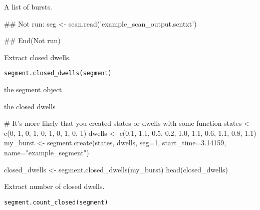 \documentclass[letterpaper]{book}
\begin{document}
%
\begin{Value}
A list of bursts.
\end{Value}
%
\begin{Examples}
\begin{ExampleCode}
## Not run: 
seg <- scan.read('example_scan_output.scntxt')

## End(Not run)
\end{ExampleCode}
\end{Examples}
%
\begin{Description}\relax
Extract closed dwells.
\end{Description}
%
\begin{Usage}
\begin{verbatim}
segment.closed_dwells(segment)
\end{verbatim}
\end{Usage}
%
\begin{Arguments}
\begin{ldescription}
\item[\code{segment}] the segment object
\end{ldescription}
\end{Arguments}
%
\begin{Value}
the closed dwells
\end{Value}
%
\begin{Examples}
\begin{ExampleCode}

# It's more likely that you created states or dwells with some function
states  <-  c(0,      1,    0,    1,    0,    1,    0,    1,    0,    1)
dwells  <-  c(0.1,  1.1,  0.5,  0.2,  1.0,  1.1,  0.6,  1.1,  0.8,  1.1)
my_burst <- segment.create(states, dwells, seg=1, start_time=3.14159, name="example_segment")

closed_dwells <- segment.closed_dwells(my_burst)
head(closed_dwells)

\end{ExampleCode}
\end{Examples}
%
\begin{Description}\relax
Extract number of closed dwells.
\end{Description}
%
\begin{Usage}
\begin{verbatim}
segment.count_closed(segment)
\end{verbatim}
\end{Usage}
\end{document}
